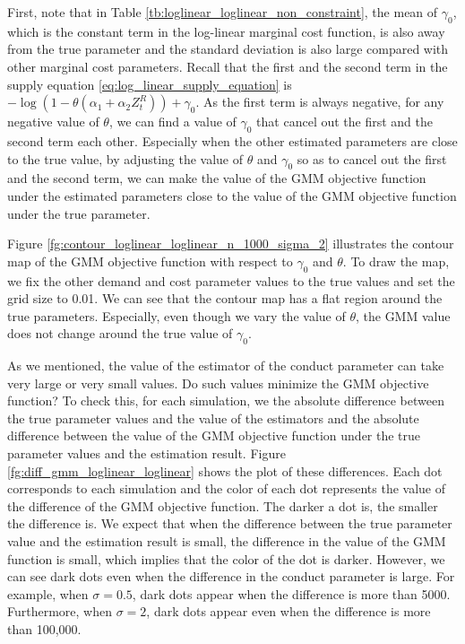 \documentclass[11pt, a4paper]{article}
\begin{document}
First, note that in Table \ref{tb:loglinear_loglinear_non_constraint}, the mean of $\gamma_0$, which is the constant term in the log-linear marginal cost function, is also away from the true parameter and the standard deviation is also large compared with other marginal cost parameters. 
Recall that the first and the second term in the supply equation \eqref{eq:log_linear_supply_equation} is $-\log(1 - \theta(\alpha_1 + \alpha_2 Z_t^R)) + \gamma_0$.
As the first term is always negative, for any negative value of $\theta$, we can find a value of $\gamma_0$ that cancel out the first and the second term each other.
Especially when the other estimated parameters are close to the true value, by adjusting the value of $\theta$ and $\gamma_0$ so as to cancel out the first and the second term, we can make the value of the GMM objective function under the estimated parameters close to the value of the GMM objective function under the true parameter.


Figure \ref{fg:contour_loglinear_loglinear_n_1000_sigma_2} illustrates the contour map of the GMM objective function  with respect to $\gamma_0$ and $\theta$.
To draw the map, we fix the other demand and cost parameter values to the true values and set the grid size to 0.01.
We can see that the contour map has a flat region around the true parameters.
Especially, even though we vary the value of $\theta$, the GMM value does not change around the true value of $\gamma_0$.

As we mentioned, the value of the estimator of the conduct parameter can take very large or very small values.
Do such values minimize the GMM objective function?
To check this, for each simulation, we the absolute difference between the true parameter values and the value of the estimators and the absolute difference between the value of the GMM objective function under the true parameter values and the estimation result.
Figure \ref{fg:diff_gmm_loglinear_loglinear} shows the plot of these differences. 
Each dot corresponds to each simulation and the color of each dot represents the value of the difference of the GMM objective function. 
The darker a dot is, the smaller the difference is.
We expect that when the difference between the true parameter value and the estimation result is small, the difference in the value of the GMM function is small, which implies that the color of the dot is darker. 
However, we can see dark dots even when the difference in the conduct parameter is large.
For example, when $\sigma = 0.5$, dark dots appear when the difference is more than 5000.
Furthermore, when $\sigma = 2$, dark dots appear even when the difference is more than 100,000.
\end{document}
